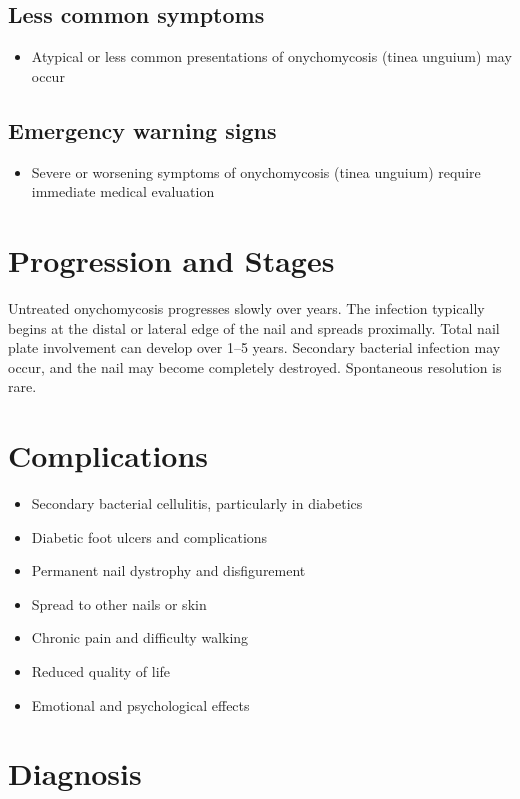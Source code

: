\subsection{Less common symptoms}
\begin{itemize}[noitemsep]
  \item Atypical or less common presentations of onychomycosis (tinea unguium) may occur
\end{itemize}

\subsection{Emergency warning signs}
\begin{itemize}[noitemsep]
  \item Severe or worsening symptoms of onychomycosis (tinea unguium) require immediate medical evaluation
\end{itemize}
\section{Progression and Stages}
Untreated onychomycosis progresses slowly over years. The infection typically begins at the distal or lateral edge of the nail and spreads proximally. Total nail plate involvement can develop over 1--5 years. Secondary bacterial infection may occur, and the nail may become completely destroyed. Spontaneous resolution is rare.

\section{Complications}

\begin{itemize}[noitemsep]
  \item Secondary bacterial cellulitis, particularly in diabetics
  \item Diabetic foot ulcers and complications
  \item Permanent nail dystrophy and disfigurement
  \item Spread to other nails or skin
  \item Chronic pain and difficulty walking
  \item Reduced quality of life
  \item Emotional and psychological effects
\end{itemize}

\section{Diagnosis}

